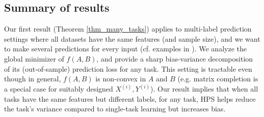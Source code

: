 \subsection{Summary of results}

Our first result (Theorem \ref{thm_many_tasks}) applies to multi-label prediction settings where all datasets have the same features (and sample size), and we want to make several predictions for every input (cf. examples in \cite{hsu2009multi}).
We analyze the global minimizer of $f(A, B)$, and provide a sharp bias-variance decomposition of its (out-of-sample) prediction loss for any task.
This setting is tractable even though in general, $f(A, B)$ is non-convex in $A$ and $B$ (e.g. matrix completion is a special case for suitably designed $X^{(i)}, Y^{(i)}$).
Our result implies that when all tasks have the same features but different labels, for any task, HPS helps reduce the task's variance compared to single-task learning but increases bias.

